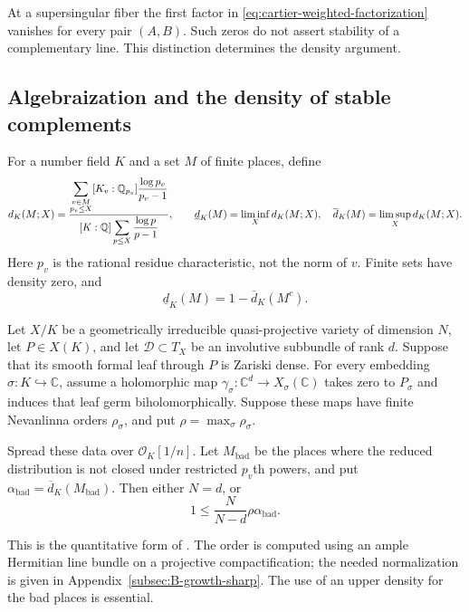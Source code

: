 At a supersingular fiber the first factor in
\eqref{eq:cartier-weighted-factorization} vanishes for every pair
$(A,B)$.  Such zeros do not assert stability of a complementary line.
This distinction determines the density argument.

\subsection{Algebraization and the density of stable complements}
\label{subsec:B-tang-packet}\label{subsec:B-hodge-complements}
For a number field $K$ and a set $M$ of finite places, define
\begin{equation}\label{eq:rev:weighted-density}
 d_K(M;X)=
 \frac{\displaystyle\sum_{\substack{v\in M\\p_v\le X}}
 [K_v:\mathbb Q_{p_v}]\frac{\log p_v}{p_v-1}}
 {[K:\mathbb Q]\displaystyle\sum_{p\le X}\frac{\log p}{p-1}},
 \qquad
 \underline d_K(M)=\liminf_Xd_K(M;X),\quad
 \overline d_K(M)=\limsup_Xd_K(M;X).
\end{equation}
Here $p_v$ is the rational residue characteristic, not the norm of
$v$.  Finite sets have density zero, and
\begin{equation}\label{eq:B-density-complement}
               \underline d_K(M)=1-\overline d_K(M^c).
\end{equation}

\begin{theorem}
\label{thm:B-Tang-external}
Let $X/K$ be a geometrically irreducible quasi-projective variety of
dimension $N$, let $P\in X(K)$, and let $\mathcal D\subset T_X$
be an involutive subbundle of rank $d$.  Suppose that its smooth
formal leaf through $P$ is Zariski dense.  For every embedding
$\sigma:K\hookrightarrow\mathbb C$, assume a holomorphic map
$\gamma_\sigma:\mathbb C^d\to X_\sigma(\mathbb C)$ takes zero
to $P_\sigma$ and induces that leaf germ biholomorphically.
Suppose these maps have finite Nevanlinna orders $\rho_\sigma$,
and put $\rho=\max_\sigma\rho_\sigma$.

Spread these data over $\mathcal O_K[1/n]$.  Let $M_{\mathrm{bad}}$
be the places where the reduced distribution is not closed under
restricted $p_v$th powers, and put
$\alpha_{\mathrm{bad}}=\overline d_K(M_{\mathrm{bad}})$.
Then either $N=d$, or
\begin{equation}\label{eq:B-Tang-inequality}
                  1\le\frac{N}{N-d}\rho\alpha_{\mathrm{bad}}.
\end{equation}
\end{theorem}
This is the quantitative form of
\cite[\S\S5.1.1--5.1.4 and Theorem 5.1.5]{Tang}.  The order is
computed using an ample Hermitian line bundle on a projective
compactification; the needed normalization is given in
Appendix~\ref{subsec:B-growth-sharp}.  The use of an upper density
for the bad places is essential.

